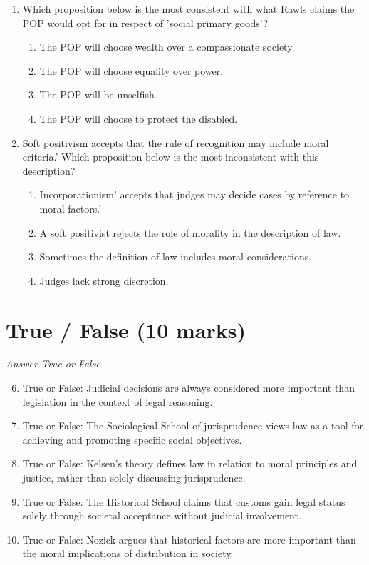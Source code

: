 \documentclass[12pt]{article}
\begin{document}
\begin{enumerate}[label=\arabic*.]
\begin{enumerate}[label=(\alph*)]
\end{enumerate}
\item Which proposition below is the most consistent with what Rawls claims the POP would opt for in respect of 'social primary goods'?
\begin{enumerate}[label=(\alph*)]
    \item The POP will choose wealth over a compassionate society.
    \item The POP will choose equality over power.
    \item The POP will be unselfish.
    \item The POP will choose to protect the disabled.
\end{enumerate}
\item Soft positivism accepts that the rule of recognition may include moral criteria.' Which proposition below is the most inconsistent with this description?
\begin{enumerate}[label=(\alph*)]
    \item Incorporationism' accepts that judges may decide cases by reference to moral factors.'
    \item A soft positivist rejects the role of morality in the description of law.
    \item Sometimes the definition of law includes moral considerations.
    \item Judges lack strong discretion.
\end{enumerate}
\end{enumerate}

\section*{True / False (10 marks)}
\textit{Answer True or False}
\begin{enumerate}[label=\arabic*.]
\setcounter{enumi}{5}
\item True or False: Judicial decisions are always considered more important than legislation in the context of legal reasoning.
\item True or False: The Sociological School of jurisprudence views law as a tool for achieving and promoting specific social objectives.
\item True or False: Kelsen's theory defines law in relation to moral principles and justice, rather than solely discussing jurisprudence.
\item True or False: The Historical School claims that customs gain legal status solely through societal acceptance without judicial involvement.
\item True or False: Nozick argues that historical factors are more important than the moral implications of distribution in society.
\end{enumerate}
\end{document}
